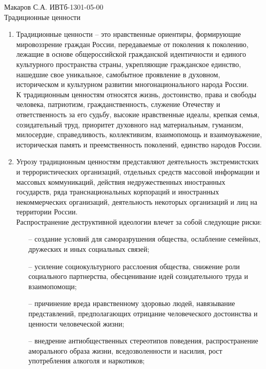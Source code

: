 \documentclass[a4paper,14pt]{extarticle}
\begin{document}
	\pagestyle{empty}
	\noindent Макаров С.А. ИВТб-1301-05-00\\
	Традиционные ценности\\
	
	\begin{enumerate}
		\item Традиционные ценности -- это нравственные ориентиры, формирующие мировоззрение граждан России, передаваемые от поколения к поколению, лежащие в основе общероссийской гражданской идентичности и единого культурного пространства страны, укрепляющие гражданское единство, нашедшие свое уникальное, самобытное проявление в духовном, историческом и культурном развитии многонационального народа России.\\
		
		К традиционным ценностям относятся жизнь, достоинство, права и свободы человека, патриотизм, гражданственность, служение Отечеству и ответственность за его судьбу, высокие нравственные идеалы, крепкая семья, созидательный труд, приоритет духовного над материальным, гуманизм, милосердие, справедливость, коллективизм, взаимопомощь и взаимоуважение, историческая память и преемственность поколений, единство народов России.
		
		\item Угрозу традиционным ценностям представляют деятельность экстремистских и террористических организаций, отдельных средств массовой информации и массовых коммуникаций, действия недружественных иностранных государств, ряда транснациональных корпораций и иностранных некоммерческих организаций, деятельность некоторых организаций и лиц на территории России.\\

		Распространение деструктивной идеологии влечет за собой следующие риски:
		\begin{itemize}
			\item[--] создание условий для саморазрушения общества, ослабление семейных, дружеских и иных социальных связей;
			
			\item[--] усиление социокультурного расслоения общества, снижение роли социального партнерства, обесценивание идей созидательного труда и взаимопомощи;
			
			\item[--] причинение вреда нравственному здоровью людей, навязывание представлений, предполагающих отрицание человеческого достоинства и ценности человеческой жизни;
			
			\item[--] внедрение антиобщественных стереотипов поведения, распространение аморального образа жизни, вседозволенности и насилия, рост употребления алкоголя и наркотиков;
			

\end{itemize}
\end{enumerate}
\end{document}
